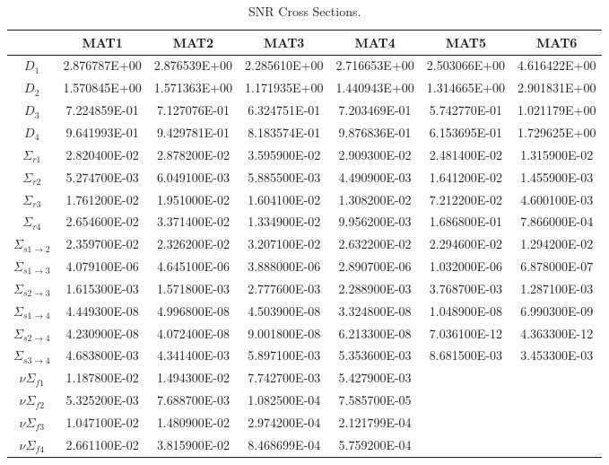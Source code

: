     \thispagestyle{lscapedplain}
    \begin{landscape}
    \begin{table}
      \caption{SNR Cross Sections.}
      \label{tab:snrxs}
      \begin{center}
        \begin{tabular}{ccccccc}
          \toprule
          &MAT1&MAT2&MAT3&MAT4&MAT5&MAT6\\
          \midrule
          $D_1$&2.876787E+00&2.876539E+00&2.285610E+00&2.716653E+00&2.503066E+00&4.616422E+00\\
          $D_2$&1.570845E+00&1.571363E+00&1.171935E+00&1.440943E+00&1.314665E+00&2.901831E+00\\
          $D_3$&7.224859E-01&7.127076E-01&6.324751E-01&7.203469E-01&5.742770E-01&1.021179E+00\\
          $D_4$&9.641993E-01&9.429781E-01&8.183574E-01&9.876836E-01&6.153695E-01&1.729625E+00\\
          $\Sigma_{r1}$&2.820400E-02&2.878200E-02&3.595900E-02&2.909300E-02&2.481400E-02&1.315900E-02\\
          $\Sigma_{r2}$&5.274700E-03&6.049100E-03&5.885500E-03&4.490900E-03&1.641200E-02&1.455900E-03\\
          $\Sigma_{r3}$&1.761200E-02&1.951000E-02&1.604100E-02&1.308200E-02&7.212200E-02&4.600100E-03\\
          $\Sigma_{r4}$&2.654600E-02&3.371400E-02&1.334900E-02&9.956200E-03&1.686800E-01&7.866000E-04\\
          $\Sigma_{s 1\rightarrow 2}$&2.359700E-02&2.326200E-02&3.207100E-02&2.632200E-02&2.294600E-02&1.294200E-02\\
          $\Sigma_{s 1\rightarrow 3}$&4.079100E-06&4.645100E-06&3.888000E-06&2.890700E-06&1.032000E-06&6.878000E-07\\
          $\Sigma_{s 2\rightarrow 3}$&1.615300E-03&1.571800E-03&2.777600E-03&2.288900E-03&3.768700E-03&1.287100E-03\\
          $\Sigma_{s 1\rightarrow 4}$&4.449300E-08&4.996800E-08&4.503900E-08&3.324800E-08&1.048900E-08&6.990300E-09\\
          $\Sigma_{s 2\rightarrow 4}$&4.230900E-08&4.072400E-08&9.001800E-08&6.213300E-08&7.036100E-12&4.363300E-12\\
          $\Sigma_{s 3\rightarrow 4}$&4.683800E-03&4.341400E-03&5.897100E-03&5.353600E-03&8.681500E-03&3.453300E-03\\
          $ \nu \Sigma_{f1}$&1.187800E-02&1.494300E-02&7.742700E-03&5.427900E-03&&\\
          $ \nu \Sigma_{f2}$&5.325200E-03&7.688700E-03&1.082500E-04&7.585700E-05&&\\
          $ \nu \Sigma_{f3}$&1.047100E-02&1.480900E-02&2.974200E-04&2.121799E-04&&\\
          $ \nu \Sigma_{f4}$&2.661100E-02&3.815900E-02&8.468699E-04&5.759200E-04&&\\
          \bottomrule
        \end{tabular}
      \end{center}
    \end{table}
    \end{landscape}
